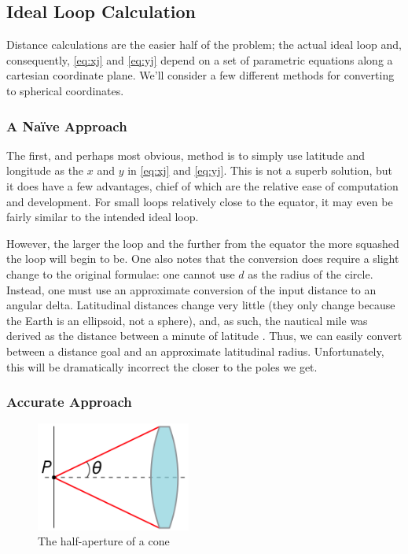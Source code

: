 \documentclass[twocolumn,12pt]{article}
\begin{document}
\subsection{Ideal Loop Calculation}

Distance calculations are the easier half of the problem;
the actual ideal loop and, consequently,
\eqref{eq:xj} and \eqref{eq:yj} depend on a set of parametric equations along
a cartesian coordinate plane. We'll consider a few different methods for
converting to spherical coordinates.

\subsubsection{A Na\"{i}ve Approach} \label{sec:naiveloop}

The first, and perhaps most obvious, method is to simply use latitude and
longitude as the $x$ and $y$ in \eqref{eq:xj} and \eqref{eq:yj}. This is
not a superb solution, but it does have a few advantages, chief of which are
the relative ease of computation and development. For small loops relatively
close to the equator, it may even be fairly similar to the intended ideal loop.

However, the larger the loop and the further from the equator the more squashed
the loop will begin to be. One also notes that the conversion does require a
slight change to the original formulae: one cannot use $d$ as the radius of the
circle. Instead, one must use an approximate conversion of the input distance
to an angular delta. Latitudinal distances change very little (they only
change because the Earth is an ellipsoid, not a sphere), and, as such, the
nautical mile was derived as the distance between a minute of latitude
. Thus, we can easily convert between a distance goal and an
approximate latitudinal radius. Unfortunately, this will be dramatically
incorrect the closer to the poles we get.

\subsubsection{Accurate Approach}

\begin{figure}
  \centering
  \includegraphics[width=2in]{images/220px-Numerical_aperture.png}
  \caption{The half-aperture of a cone } \label{fig:aperture}
\end{figure}
\end{document}
